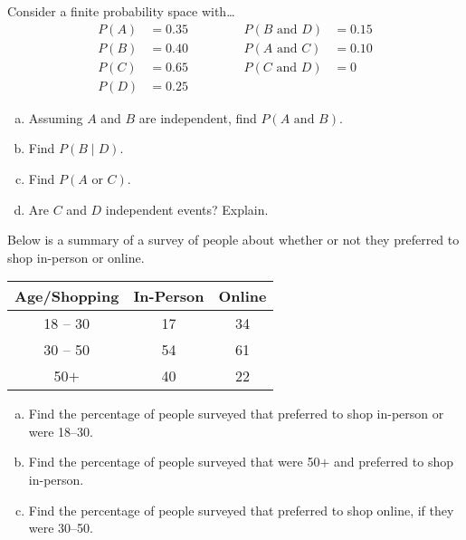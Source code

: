 \documentclass[12pt,letterpaper]{exam}
\begin{document}
\examtitle
{} 
\scores
\bottomline
\newpage

\begin{questions}

\newpage
\question[10] Consider a finite probability space with\dots
	\[
	\begin{aligned}
	P(A)&= 0.35   \qquad& 	&& P(B \text{ and } D)&= 0.15 \\
	P(B)&= 0.40 		& 	&& P(A \text{ and } C)&= 0.10 \\
	P(C)&= 0.65 		& 	&& P(C \text{ and } D)&= 0 \\
	P(D)&= 0.25
	\end{aligned}
	\]

\begin{enumerate}[(a)]
\item Assuming $A$ and $B$ are independent, find $P(A \text{ and } B)$. 
\item Find $P(B \;|\; D)$.
\item Find $P(A \text{ or } C)$.
\item Are $C$ and $D$ independent events? Explain. 
\end{enumerate}



\newpage
\question[10] Below is a summary of a survey of people about whether or not they preferred to shop in-person or online. \par
	\begin{table}[h]
	\centering
	\begin{tabular}{c|cc}
	Age/Shopping & In-Person & Online \\ \hline
	18 -- 30 & 17 & 34 \\
	30 -- 50 & 54 & 61 \\
	50$+$ & 40 & 22
	\end{tabular}
	\end{table} \par

\begin{enumerate}[(a)]
\item Find the percentage of people surveyed that preferred to shop in-person or were 18--30. 
\item Find the percentage of people surveyed that were 50$+$ and preferred to shop in-person. 
\item Find the percentage of people surveyed that preferred to shop online, if they were 30--50. 
\end{enumerate}




\end{questions}
\end{document}
